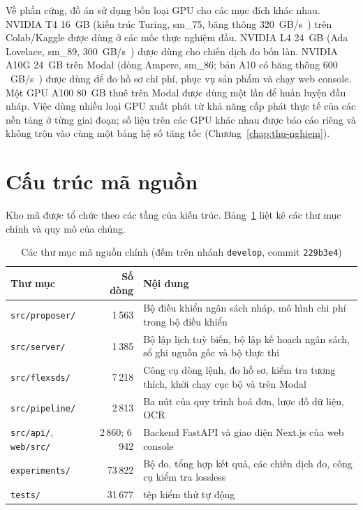 Về phần cứng, đồ án sử dụng bốn loại GPU cho các mục đích khác nhau. NVIDIA T4 16~GB (kiến trúc Turing, sm\_75, băng thông $320$~GB/s~\cite{nvidia-t4}) trên Colab/Kaggle được dùng ở các mốc thực nghiệm đầu. NVIDIA L4 24~GB (Ada Lovelace, sm\_89, $300$~GB/s~\cite{nvidia-l4}) được dùng cho chiến dịch đo bốn làn. NVIDIA A10G 24~GB trên Modal (dòng Ampere, sm\_86; bản A10 có băng thông $600$~GB/s~\cite{nvidia-a10}) được dùng để đo hồ sơ chi phí, phục vụ sản phẩm và chạy web console. Một GPU A100 80~GB thuê trên Modal được dùng một lần để huấn luyện đầu nháp. Việc dùng nhiều loại GPU xuất phát từ khả năng cấp phát thực tế của các nền tảng ở từng giai đoạn; số liệu trên các GPU khác nhau được báo cáo riêng và không trộn vào cùng một bảng hệ số tăng tốc (Chương~\ref{chap:thu-nghiem}).

\section{Cấu trúc mã nguồn}
\label{sec:cau-truc-ma}

Kho mã được tổ chức theo các tầng của kiến trúc. Bảng~\ref{tab:cau-truc-ma} liệt kê các thư mục chính và quy mô của chúng.

\begin{table}[htbp]
\centering
\caption{Các thư mục mã nguồn chính (đếm trên nhánh \texttt{develop}, commit \texttt{229b3e4})}
\label{tab:cau-truc-ma}
\small
\begin{tabularx}{\linewidth}{@{}>{\raggedright\arraybackslash}p{32mm}r>{\raggedright\arraybackslash}X@{}}
\toprule
\textbf{Thư mục} & \textbf{Số dòng} & \textbf{Nội dung} \\
\midrule
\texttt{src/proposer/} & 1\,563 & Bộ điều khiển ngân sách nháp, mô hình chi phí trong bộ điều khiển \\
\texttt{src/server/} & 1\,385 & Bộ lập lịch tuỳ biến, bộ lập kế hoạch ngân sách, sổ ghi nguồn gốc và bộ thực thi \\
\texttt{src/flexsds/} & 7\,218 & Công cụ dòng lệnh, đo hồ sơ, kiểm tra tương thích, khởi chạy cục bộ và trên Modal \\
\texttt{src/pipeline/} & 2\,813 & Ba nút của quy trình hoá đơn, lược đồ dữ liệu, OCR \\
\texttt{src/api/}, \texttt{web/src/} & 2\,860; 6\,942 & Backend FastAPI và giao diện Next.js của web console \\
\texttt{experiments/} & 73\,822 & Bộ đo, tổng hợp kết quả, các chiến dịch đo, công cụ kiểm tra lossless \\
\texttt{tests/} & 31\,677 & 146 tệp kiểm thử tự động \\
\bottomrule
\end{tabularx}
\end{table}


